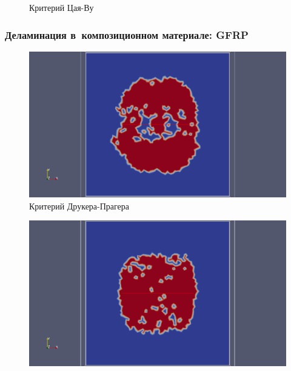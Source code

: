 \documentclass[xcolor={usenames,dvipsnames,svgnames,table}]{beamer}
\begin{document}
\begin{frame}
\begin{center}
\begin{minipage}[h]{0.33\textwidth}
\begin{figure}[h]
                \tiny
                \caption{Критерий Цая-Ву}
            \end{figure}
        \end{minipage}
    \end{center}
\end{frame}

\begin{frame}
    \frametitle{Деламинация в~композиционном материале: GFRP}
    \vspace{-2.5em}
    \begin{center}
        \begin{minipage}[h]{0.33\textwidth}
            \begin{figure}[h]
                \includegraphics[width=\textwidth]{png/destruction/2lg-drpr-delam.png}
                \tiny
                \caption{Критерий Друкера-Прагера}
            \end{figure}
        \end{minipage}
        \begin{minipage}[h]{0.33\textwidth}
            \begin{figure}[h]
                \includegraphics[width=\textwidth]{png/destruction/2lg-hashin-delam.png}

\end{figure}
\end{minipage}
\end{center}
\end{frame}
\end{document}
